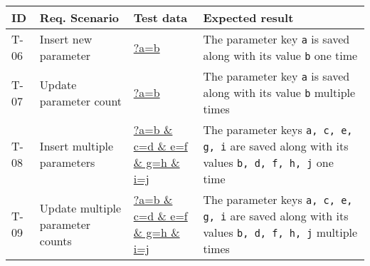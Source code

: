 \begin{tabularx}{\textwidth}{p{} p{} p{} p{}}
  \caption{Test definitions for upserting parameters}                                                                                                                                                                                                                                                                                                                                                                          \\
  \toprule
  \textbf{ID} & \textbf{Req. Scenario}                                & \textbf{Test data} & \textbf{Expected result}                                                                                                                                                                                                                                                                                                          \\
  \midrule
  T-06        & Insert new parameter                                  & \url{?a=b}         & The parameter key \texttt{a} is saved along with its value \texttt{b} one time                                                                                                                                                                                                                                                    \\
  \midrule
  T-07        & Update parameter count                                & \url{?a=b}         & The parameter key \texttt{a} is saved along with its value \texttt{b} multiple times                                                                                                                                                                                                                                              \\
  \midrule
  T-08        & Insert multiple parameters                            & \url{?a=b          & c=d                                                                                  & e=f                                                                                                         & g=h & i=j} & The parameter keys \texttt{a, c, e, g, i} are saved along with its values \texttt{b, d, f, h, j} one time       \\
  \midrule
  T-09        & Update multiple parameter counts                      & \url{?a=b          & c=d                                                                                  & e=f                                                                                                         & g=h & i=j} & The parameter keys \texttt{a, c, e, g, i} are saved along with its values \texttt{b, d, f, h, j} multiple times \\

\end{tabularx}
